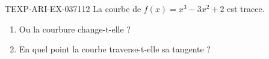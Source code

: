 \begin{exercice}{TEXP-ARI-EX-037}{1}{12}
La courbe de $f(x) = x^3 - 3x^2 + 2$ est tracee.
\begin{enumerate}
  \item Ou la courbure change-t-elle ?
  \item En quel point la courbe traverse-t-elle sa tangente ?
\end{enumerate}

\end{exercice}
